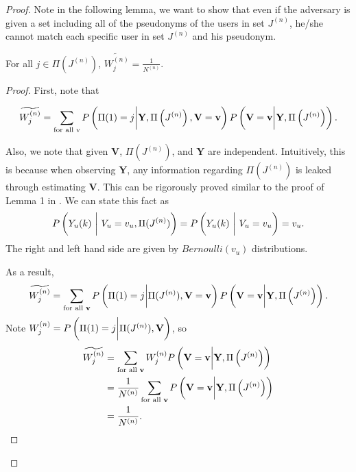 \begin{proof}
Note in the following lemma, we want to show that even if the adversary is given a set including all of the pseudonyms of the users in set $J^{(n)}$, he/she cannot match each specific user in set $J^{(n)}$ and his pseudonym.

\begin{lem}
	\label{lem3}
	For all $j \in \Pi (J^{(n)})$, $\widetilde{W_j^{(n)}}=\frac{1}{N^{(n)}}.$
\end{lem}

\begin{proof}
First, note that


\begin{align*}
\widetilde{W_j^{(n)}} = \sum_{\text{for all v}} P\left(\Pi(1)=j \bigg{|} \textbf{Y}, \Pi \left(J^{(n)}\right), \textbf{V}=\textbf{v}\right) P\left(\textbf{V}=\textbf{v} \bigg{|} \textbf{Y}, \Pi \left(J^{(n)}\right)\right).
\end{align*}

Also, we note that given $\textbf{V}$, $\Pi(J^{(n)})$, and $\textbf{Y}$ are independent. Intuitively, this is because when observing $\textbf{Y}$, any information regarding $\Pi(J^{(n)})$ is leaked through estimating $\textbf{V}$. This can be rigorously proved similar to the proof of Lemma 1 in \cite{tifs2016}. We can state this fact as
\[
	P\left(Y_u(k)\  \bigg{ | }  \ {V}_u=v_u, \Pi(J^{(n)}) \right)  = P\left(Y_u(k)\  \bigg{ | } \ {V}_u=v_u\right)=v_u.
\]
The right and left hand side are given by $Bernoulli (v_u)$ distributions.

As a result,
\[
\widetilde{W_j^{(n)}} = \sum_{\text{for all \textbf{v}}} P\left(\Pi(1)=j \bigg{|} \Pi (J^{(n)}), \textbf{V}=\textbf{v}\right) P\left(\textbf{V}=\textbf{v} \bigg{|} \textbf{Y}, \Pi \left(J^{(n)}\right)\right).
\]
Note $W_j^{(n)}=P\left(\Pi(1)=j \bigg{|} \Pi (J^{(n)}), \textbf{V}\right)$, so
\begin{align}
\nonumber \widetilde{W_j^{(n)}} &= \sum_{\text{for all \textbf{v}}}W_j^{(n)}  P\left(\textbf{V}=\textbf{v} \bigg{|} \textbf{Y}, \Pi \left(J^{(n)}\right) \right) \\
\nonumber &= \frac{1}{N^{(n)}}\sum_{\text{for all \textbf{v}}} P\left(\textbf{V}=\textbf{v}\bigg{|} \textbf{Y}, \Pi \left(J^{(n)}\right)\right) \\
\nonumber &= \frac {1}{N^{(n)}}.\ \
\end{align}
\end{proof}


\end{proof}

